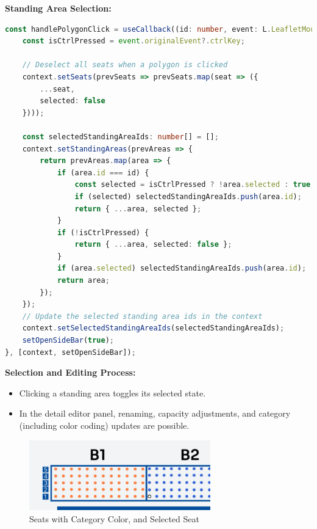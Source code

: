 \textbf{Standing Area Selection:}
\begin{lstlisting}[language=TypeScript, caption=Handling Standing Area Selection, label=lst:select-standingareas]
const handlePolygonClick = useCallback((id: number, event: L.LeafletMouseEvent) => {
    const isCtrlPressed = event.originalEvent?.ctrlKey;

    // Deselect all seats when a polygon is clicked
    context.setSeats(prevSeats => prevSeats.map(seat => ({
        ...seat,
        selected: false
    })));

    const selectedStandingAreaIds: number[] = [];
    context.setStandingAreas(prevAreas => {
        return prevAreas.map(area => {
            if (area.id === id) {
                const selected = isCtrlPressed ? !area.selected : true;
                if (selected) selectedStandingAreaIds.push(area.id);
                return { ...area, selected };
            }
            if (!isCtrlPressed) {
                return { ...area, selected: false };
            }
            if (area.selected) selectedStandingAreaIds.push(area.id);
            return area;
        });
    });
    // Update the selected standing area ids in the context
    context.setSelectedStandingAreaIds(selectedStandingAreaIds);
    setOpenSideBar(true);
}, [context, setOpenSideBar]);
\end{lstlisting}

\textbf{Selection and Editing Process:}
\begin{itemize}
    \item Clicking a standing area toggles its selected state.
    \item In the detail editor panel, renaming, capacity adjustments, and category (including color coding) updates are possible.
\end{itemize}

\begin{figure}[H]
    \centering
    \includegraphics[width=0.7\textwidth]{pics/MapComponentCategoryAndSelectedSeat.png}
    \caption{Seats with Category Color, and Selected Seat}
    \label{fig:map-component-category}
\end{figure}

